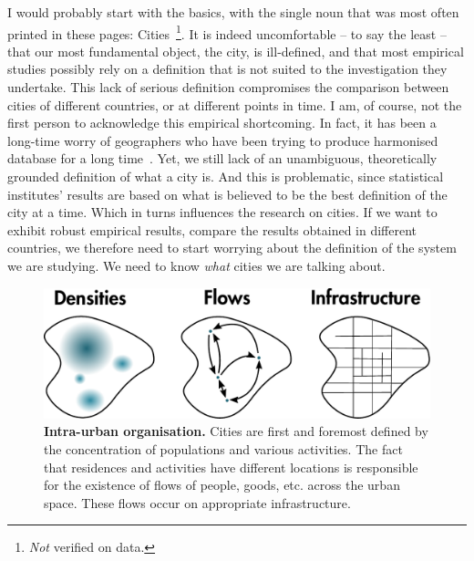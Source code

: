 I would probably start with the basics, with the single noun that was most often
printed in these pages: Cities~\footnote{\emph{Not} verified on data.}. It is
indeed uncomfortable -- to say the least -- that our most fundamental object,
the city, is ill-defined, and that most empirical studies possibly rely on a definition
that is not suited to the investigation they undertake.  This lack of serious
definition compromises the comparison between cities of different countries, or
at different points in time. I am, of course,
not the first person to acknowledge this empirical shortcoming. In fact, it has
been a long-time worry of geographers who have been trying to produce harmonised
database for a long time~\cite{Pumain:2015}. Yet, we still lack of an
unambiguous, theoretically grounded definition of what a city is. And this is
problematic, since statistical institutes' results are based on what is believed
to be the best definition of the city at a time. Which in turns influences the
research on cities. If we want to exhibit robust empirical results, compare the
results obtained in different countries, we therefore need to start worrying
about the definition of the system we are studying. We need to know \emph{what}
cities we are talking about.\\

\begin{figure}
    \centering
    \includegraphics[width=1\textwidth]{gfx/chapter-intro/intra-urban.pdf}
    \caption{{\bf Intra-urban organisation.} Cities are first and foremost defined by
    the concentration of populations and various activities. The fact that
residences and activities have different locations is responsible for the
existence of flows of people, goods, etc. across the urban space. These flows
occur on appropriate infrastructure.\label{fig:intra_urban}}
\end{figure}


